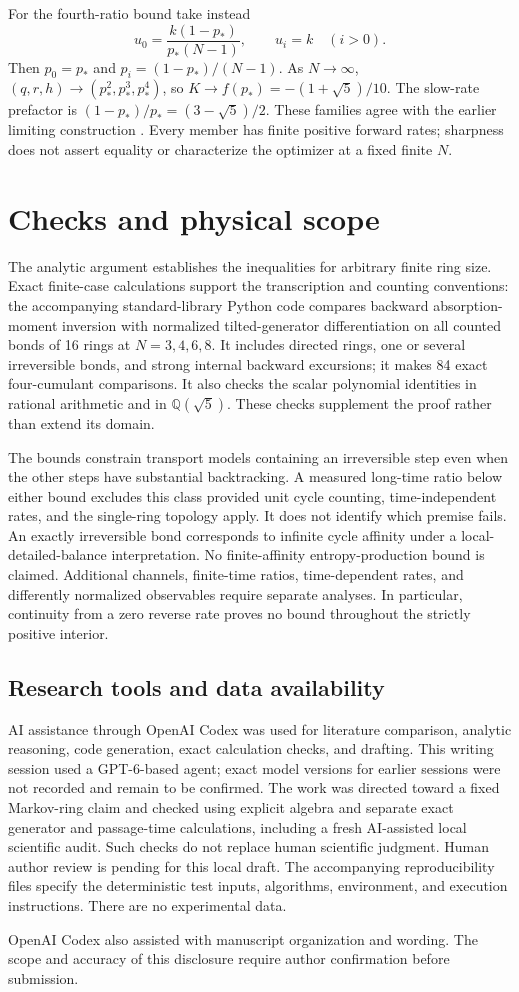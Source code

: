 \documentclass[aps,pre,preprint,superscriptaddress,nofootinbib]{revtex4-2}
\begin{document}
For the fourth-ratio bound take instead
\begin{equation}
 u_0=\frac{k(1-p_*)}{p_*(N-1)},\qquad u_i=k\quad(i>0).
\end{equation}
Then $p_0=p_*$ and $p_i=(1-p_*)/(N-1)$. As $N\to\infty$, $(q,r,h)\to(p_*^2,p_*^3,p_*^4)$, so $K\to f(p_*)=-(1+\sqrt5)/10$.
The slow-rate prefactor is $(1-p_*)/p_*=(3-\sqrt5)/2$.
These families agree with the earlier limiting construction \cite{Ptaszynski2022}. Every member has finite positive forward rates; sharpness does not assert equality or characterize the optimizer at a fixed finite $N$.

\section{Checks and physical scope}
The analytic argument establishes the inequalities for arbitrary finite ring size. Exact finite-case calculations support the transcription and counting conventions: the accompanying standard-library Python code compares backward absorption-moment inversion with normalized tilted-generator differentiation on all counted bonds of 16 rings at $N=3,4,6,8$. It includes directed rings, one or several irreversible bonds, and strong internal backward excursions; it makes 84 exact four-cumulant comparisons. It also checks the scalar polynomial identities in rational arithmetic and in $\mathbb Q(\sqrt5)$. These checks supplement the proof rather than extend its domain.

The bounds constrain transport models containing an irreversible step even when the other steps have substantial backtracking. A measured long-time ratio below either bound excludes this class provided unit cycle counting, time-independent rates, and the single-ring topology apply. It does not identify which premise fails.
An exactly irreversible bond corresponds to infinite cycle affinity under a local-detailed-balance interpretation. No finite-affinity entropy-production bound is claimed. Additional channels, finite-time ratios, time-dependent rates, and differently normalized observables require separate analyses. In particular, continuity from a zero reverse rate proves no bound throughout the strictly positive interior.

\subsection*{Research tools and data availability}
AI assistance through OpenAI Codex was used for literature comparison, analytic reasoning, code generation, exact calculation checks, and drafting. This writing session used a GPT-6-based agent; exact model versions for earlier sessions were not recorded and remain to be confirmed. The work was directed toward a fixed Markov-ring claim and checked using explicit algebra and separate exact generator and passage-time calculations, including a fresh AI-assisted local scientific audit. Such checks do not replace human scientific judgment. Human author review is pending for this local draft.
The accompanying reproducibility files specify the deterministic test inputs, algorithms, environment, and execution instructions. There are no experimental data.

\begin{acknowledgments}
OpenAI Codex also assisted with manuscript organization and wording. The scope and accuracy of this disclosure require author confirmation before submission.
\end{acknowledgments}


\end{document}
